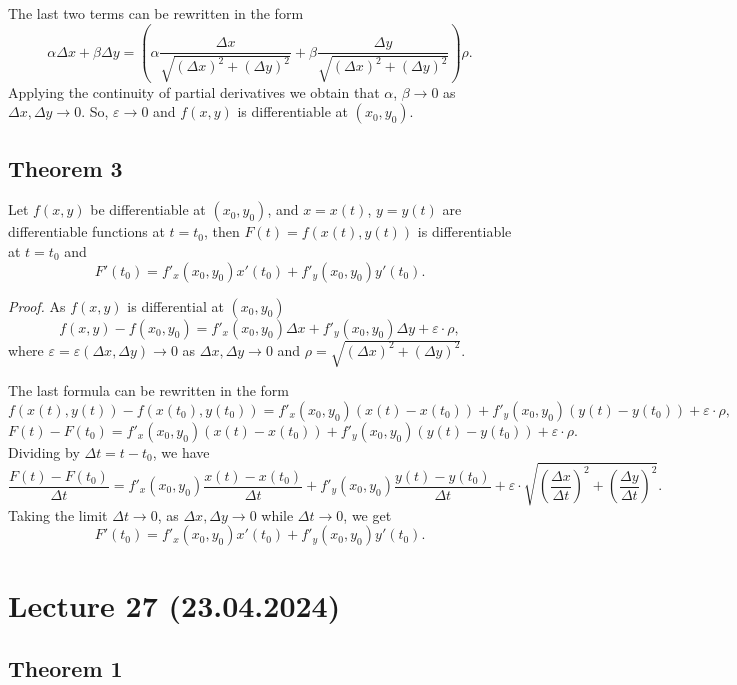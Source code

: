 \documentclass{article}
\begin{document}
The last two terms can be rewritten in the form
\[
\alpha \Delta x + \beta \Delta y = \left(\alpha \frac{\Delta x}{\sqrt{(\Delta x)^2 + (\Delta y)^2}} + \beta \frac{\Delta y}{\sqrt{(\Delta x)^2 + (\Delta y)^2}}\right)\rho.
\]
Applying the continuity of partial derivatives we obtain that $\alpha$, $\beta \to 0$ as $\Delta x, \Delta y \to 0$. So, $\varepsilon \to 0$ and $f(x, y)$ is differentiable at $(x_0, y_0)$.

\subsection*{Theorem 3}

\begin{theorem}
Let $f(x, y)$ be differentiable at $(x_0, y_0)$, and $x = x(t)$, $y = y(t)$ are differentiable functions at $t = t_0$, then $F(t) = f(x(t), y(t))$ is differentiable at $t = t_0$ and
\[
F'(t_0) = f'_x (x_0, y_0)x'(t_0) + f'_y (x_0, y_0)y'(t_0).
\]
\end{theorem}

\vspace{1em}

\textit{Proof.} As $f(x, y)$ is differential at $(x_0, y_0)$
\[
f(x, y) - f(x_0, y_0) = f'_x (x_0, y_0) \Delta x + f'_y (x_0, y_0) \Delta y + \varepsilon \cdot \rho,
\]
where $\varepsilon = \varepsilon (\Delta x, \Delta y) \to 0$ as $\Delta x, \Delta y \to 0$ and $\rho = \sqrt{(\Delta x)^2 + (\Delta y)^2}$.

The last formula can be rewritten in the form
\[
f(x(t), y(t)) - f(x(t_0), y(t_0)) = f'_x (x_0, y_0) (x(t) - x(t_0)) + f'_y (x_0, y_0) (y(t) - y(t_0)) + \varepsilon \cdot \rho,
\]
\[
F(t) - F(t_0) = f'_x (x_0, y_0) (x(t) - x(t_0)) + f'_y (x_0, y_0) (y(t) - y(t_0)) + \varepsilon \cdot \rho.
\]
Dividing by $\Delta t = t - t_0$, we have
\[
\frac{F(t) - F(t_0)}{
\Delta t} = f'_x (x_0, y_0) \frac{x(t) - x(t_0)}{\Delta t} + f'_y (x_0, y_0) \frac{y(t) - y(t_0)}{\Delta t} + \varepsilon \cdot \sqrt{\left(\frac{\Delta x}{\Delta t}\right)^2 + \left(\frac{\Delta y}{\Delta t}\right)^2}.
\]
Taking the limit $\Delta t \to 0$, as $\Delta x, \Delta y \to 0$ while $\Delta t \to 0$, we get
\[
F'(t_0) = f'_x (x_0, y_0)x'(t_0) + f'_y (x_0, y_0)y'(t_0).
\]

\section*{Lecture 27 (23.04.2024)}

\subsection*{Theorem 1}
\end{document}
